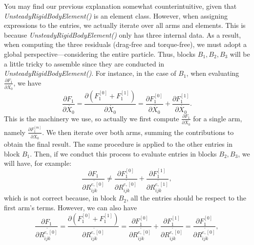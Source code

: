 \documentclass[a4paper,12pt]{article}
\begin{document}
You may find our previous explanation somewhat counterintuitive, given that \textit{UnsteadyRigidBodyElement()} is an element class. However, when assigning expressions to the entries, we actually iterate over all arms and elements. This is because \textit{UnsteadyRigidBodyElement()} only has three internal data. As a result, when computing the three residuals (drag-free and torque-free), we must adopt a global perspective—considering the entire particle. Thus, blocks $B_1,B_2,B_3$ will be a little tricky to assemble since they are conducted in \textit{UnsteadyRigidBodyElement()}. For instance, in the case of $B_1$​, when evaluating $\frac{\partial F_1}{\partial\dot{X_0}}$, we have 
\begin{equation}
	\label{eqn:127}
\frac{\partial F_1}{\partial\dot{X_0}}=\frac{\partial (F_1^{[0]}+F_1^{[1]})}{\partial\dot{X_0}}=\frac{\partial F_1^{[0]}}{\partial\dot{X_0}}+\frac{\partial F_1^{[1]}}{\partial\dot{X_0}}.
\end{equation}
This is the machinery we use, so actually we first compute $\frac{\partial F_1}{\partial\dot{X_0}}$ for a single arm, namely $\frac{\partial F_1^{[m]}}{\partial\dot{X_0}}$. We then iterate over both arms, summing the contributions to obtain the final result. The same procedure is applied to the other entries in block $B_1$​. Then, if we conduct this process to evaluate entries in blocks $B_2,B_3$, we will have, for example:
\begin{equation}
	\label{eqn:128}
	\frac{\partial F_1}{\partial\dot{R_{ijk}^{e,[0]}}}\neq\frac{\partial F_1^{[0]}}{\partial\dot{R_{ijk}^{e,[0]}}}+\frac{\partial F_1^{[1]}}{\partial\dot{R_{ijk}^{e,[1]}}},
\end{equation}
which is not correct because, in block $B_2$, all the entries should be respect to the first arm's terms. However, we can also have 
\begin{equation}
	\label{eqn:129}
	\frac{\partial F_1}{\partial\dot{R_{ijk}^{e,[0]}}}=\frac{\partial( F_1^{[0]}+F_1^{[1]})}{\partial\dot{R_{ijk}^{e,[0]}}}=\frac{\partial F_1^{[0]}}{\partial\dot{R_{ijk}^{e,[0]}}}+\frac{\partial F_1^{[1]}}{\partial\dot{R_{ijk}^{e,[0]}}}=\frac{\partial F_1^{[0]}}{\partial\dot{R_{ijk}^{e,[0]}}},
\end{equation}
\end{document}
